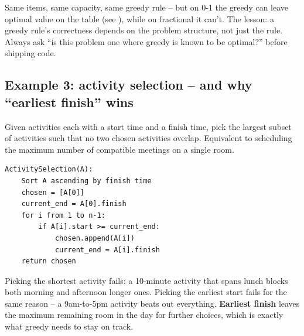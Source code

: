 \documentclass[11pt]{article}
\begin{document}
\begin{ideabox}
Same items, same capacity, same greedy rule -- but on 0-1 the greedy
can leave optimal value on the table (see ), while on
fractional it can't. The lesson: a greedy rule's correctness depends
on the problem structure, not just the rule. Always ask ``is this
problem one where greedy is known to be optimal?'' before shipping
code.
\end{ideabox}

\subsection{Example 3: activity selection -- and why ``earliest finish'' wins}

\begin{defnbox}
Given activities each with a start time and a finish time, pick the
largest subset of activities such that no two chosen activities
overlap. Equivalent to scheduling the maximum number of compatible
meetings on a single room.
\end{defnbox}

\begin{examplebox}
\begin{verbatim}
ActivitySelection(A):
    Sort A ascending by finish time
    chosen = [A[0]]
    current_end = A[0].finish
    for i from 1 to n-1:
        if A[i].start >= current_end:
            chosen.append(A[i])
            current_end = A[i].finish
    return chosen
\end{verbatim}
\end{examplebox}

\begin{notebox}
Picking the shortest activity fails: a 10-minute activity that spans
lunch blocks both morning and afternoon longer ones. Picking the
earliest start fails for the same reason -- a 9am-to-5pm activity
beats out everything. \textbf{Earliest finish} leaves the maximum
remaining room in the day for further choices, which is exactly what
greedy needs to stay on track.
\end{notebox}
\end{document}
